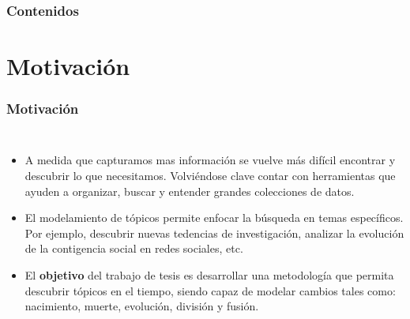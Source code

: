 \documentclass[
	spanish, %
	aspectratio=43, %
	hyperref={pdfencoding=auto,psdextra},
	xcolor={dvipsnames,table,usenames}
]{beamer}
\title[\documentsubtitle]{\documenttitle}
\subtitle{\documentsubject}
\author[\documentauthor]{
	\documentauthor \newline\newline
Profesor guía: Richard Weber \newline
Miembros de la comisión: Giorgiogiulio Parra, Ángel Jiménez
}
\institute[UChile]{
	\texttt{[image: \\universitydepartmentimage]} \\
	\medskip
	\universityname \\
	\universityfaculty \\
	\universitydepartment
}
\date[\today]{\footnotesize{\today}}
\begin{document}
\templatePagecfg

\templateFinalcfg




\begin{frame}
	\frametitle{Contenidos}
	\tableofcontents
\end{frame}


\section{Motivación}

\begin{frame}
\frametitle{Motivación} 

\begin{columns}[c]

\begin{itemize}
  \item A medida que capturamos mas información se vuelve más difícil encontrar y descubrir lo que necesitamos. Volviéndose clave contar con herramientas que ayuden a organizar, buscar y entender grandes colecciones de datos.
  \item El modelamiento de tópicos permite enfocar la búsqueda en temas específicos. Por ejemplo, descubrir nuevas tedencias de investigación, analizar la evolución de la contigencia social en redes sociales, etc.
  \item El \textbf{objetivo} del trabajo de tesis es desarrollar una metodología que permita descubrir tópicos en el tiempo, siendo capaz de modelar cambios tales como: nacimiento, muerte, evolución, división y fusión.
\end{itemize}
\end{columns}




\end{frame}
\end{document}
